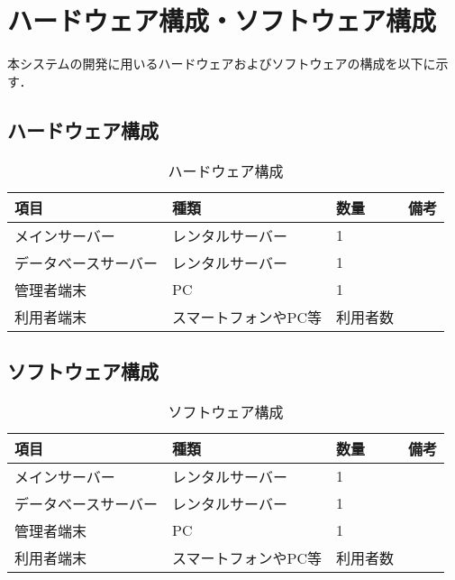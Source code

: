 \section{ハードウェア構成・ソフトウェア構成}
本システムの開発に用いるハードウェアおよびソフトウェアの構成を以下に示す．
\subsection{ハードウェア構成}
\begin{table}[]
    \centering
    \caption{ハードウェア構成}
    \label{tab:hardware}
    \begin{tabular}{llll}
    \hline
    項目         & 種類          & 数量   & 備考 \\ \hline
    メインサーバー    & レンタルサーバー    & 1    &    \\
    データベースサーバー & レンタルサーバー    & 1    &    \\
    管理者端末      & PC          & 1    &    \\
    利用者端末      & スマートフォンやPC等 & 利用者数 &    \\ \hline
    \end{tabular}
\end{table}

\subsection{ソフトウェア構成}
\begin{table}[]
    \centering
    \caption{ソフトウェア構成}
    \label{tab:software}
    \begin{tabular}{llll}
    \hline
    項目         & 種類          & 数量   & 備考 \\ \hline
    メインサーバー    & レンタルサーバー    & 1    &    \\
    データベースサーバー & レンタルサーバー    & 1    &    \\
    管理者端末      & PC          & 1    &    \\
    利用者端末      & スマートフォンやPC等 & 利用者数 &    \\ \hline
    \end{tabular}
\end{table}